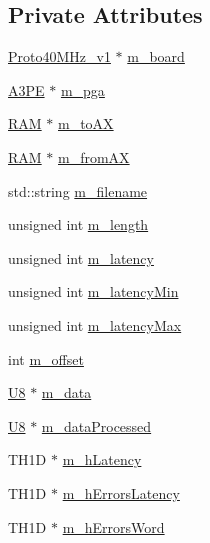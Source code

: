 \subsection*{Private Attributes}
\begin{DoxyCompactItemize}
\item 
\hyperlink{classProto40MHz__v1}{Proto40\+M\+Hz\+\_\+v1} $\ast$ \hyperlink{classA3PE__BitFlip_a2ade653b4fda5f531b5de28233cdb749}{m\+\_\+board}
\item 
\hyperlink{classA3PE}{A3\+PE} $\ast$ \hyperlink{classA3PE__BitFlip_ad20d7abccf27fa87b931cb77cd6b5e41}{m\+\_\+pga}
\item 
\hyperlink{classRAM}{R\+AM} $\ast$ \hyperlink{classA3PE__BitFlip_a0ac416167c83d423cda4e09a892b5255}{m\+\_\+to\+AX}
\item 
\hyperlink{classRAM}{R\+AM} $\ast$ \hyperlink{classA3PE__BitFlip_aad9a62adac072bed5de87406ce4cd77d}{m\+\_\+from\+AX}
\item 
std\+::string \hyperlink{classA3PE__BitFlip_a72eecaff11d66c7f3eee10a9b2bfa301}{m\+\_\+filename}
\item 
unsigned int \hyperlink{classA3PE__BitFlip_aba0564f2bb8a8ab549da428171d6a3d6}{m\+\_\+length}
\item 
unsigned int \hyperlink{classA3PE__BitFlip_a6f5ad1d6595e98c2fbd58f43e2754322}{m\+\_\+latency}
\item 
unsigned int \hyperlink{classA3PE__BitFlip_aeae11ece90351542cae8e0590d9162ee}{m\+\_\+latency\+Min}
\item 
unsigned int \hyperlink{classA3PE__BitFlip_adfeac5a7ab09d89f0d0146113dd55dde}{m\+\_\+latency\+Max}
\item 
int \hyperlink{classA3PE__BitFlip_ac0797dd65b1aeab96647d795e2f1a447}{m\+\_\+offset}
\item 
\hyperlink{classA3PE__BitFlip_ac561e6bbd8d4101ecc32016314a07581}{U8} $\ast$ \hyperlink{classA3PE__BitFlip_a06e7c01e11710261168bb0e12e2e4ac5}{m\+\_\+data}
\item 
\hyperlink{classA3PE__BitFlip_ac561e6bbd8d4101ecc32016314a07581}{U8} $\ast$ \hyperlink{classA3PE__BitFlip_a5e64d319904fc8a6fe70b92afcf6ef4f}{m\+\_\+data\+Processed}
\item 
T\+H1D $\ast$ \hyperlink{classA3PE__BitFlip_a83928ea28c555c19f4e95cf7863c1b0c}{m\+\_\+h\+Latency}
\item 
T\+H1D $\ast$ \hyperlink{classA3PE__BitFlip_a4dec854e8123271c9a624ca46c50dfd5}{m\+\_\+h\+Errors\+Latency}
\item 
T\+H1D $\ast$ \hyperlink{classA3PE__BitFlip_a0d9ea71af465c060689be4c05cba9a8e}{m\+\_\+h\+Errors\+Word}
\end{DoxyCompactItemize}


